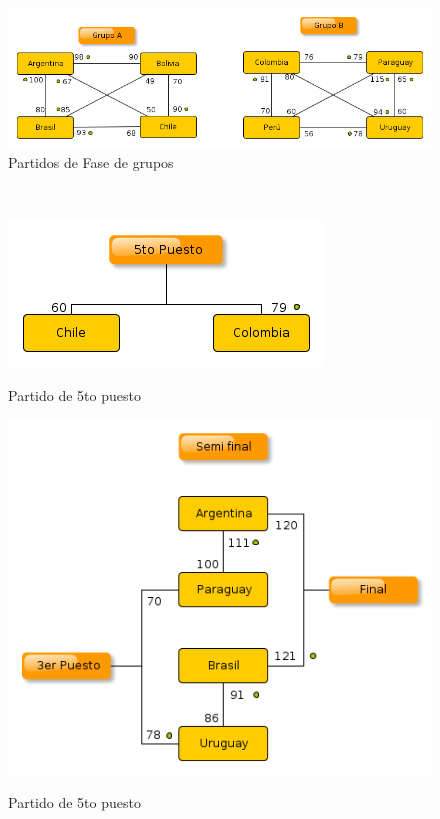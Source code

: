 \documentclass[11pt, a4paper, spanish]{article}
\begin{document}
{{{\begin{figure}[hb]
	\begin{center}
		\includegraphics[scale=0.6]{diagramas/partidoDeFase.png}\\
		\caption{Partidos de Fase de grupos}
	\end{center}
$\qquad$
$\qquad$
$\qquad$
$\qquad$
	\begin{center}
		\includegraphics[scale=0.6]{diagramas/partido5toPuesto.png}\\
		\caption{Partido de 5to puesto}
	\end{center}
\end{figure}

\begin{figure}
	\centering
	\includegraphics[scale=0.6]{diagramas/partidoSemi3erYFinal.png}\\
	\caption{Partido de 5to puesto}
\end{figure}

}}}
\end{document}

